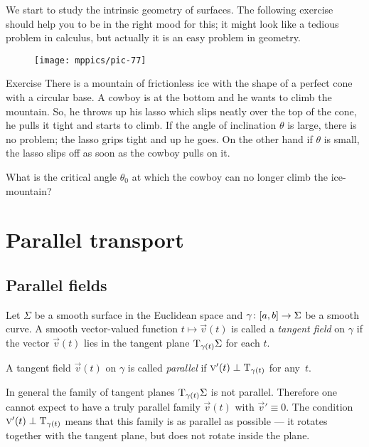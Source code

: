 We start to study the intrinsic geometry of surfaces.
The following exercise should help you to be in the right mood for this;
it might look like a tedious problem in calculus, but actually it is an easy problem in geometry.

\begin{wrapfigure}{r}{33 mm}
\vskip-0mm
\centering
\texttt{[image: mppics/pic-77]}
\vskip-0mm
\end{wrapfigure}

\begin{thm}{Exercise}\label{ex:lasso}
There is a mountain of frictionless ice with the shape of a perfect cone with a circular base.
A cowboy is at the bottom and he wants to climb the mountain.
So, he throws up his lasso which slips neatly over the top of the cone, he pulls it tight and starts to climb.
If the angle of inclination $\theta$ is large, there is no problem; the lasso grips tight and up he goes.
On the other hand if $\theta$ is small, the lasso slips off as soon as the cowboy pulls on it.

What is the critical angle $\theta_0$ at which the cowboy can no longer climb the ice-mountain?
\end{thm}

\chapter{Parallel transport}

\section*{Parallel fields}

Let $\Sigma$ be a smooth surface in the Euclidean space and $\gamma\:[a,b]\z\to \Sigma$ be a smooth curve.
A smooth vector-valued function $t\mapsto {\vec v}(t)$ is called a \emph{tangent field} on $\gamma$ if
the vector ${\vec v}(t)$ lies in the tangent plane $\mathrm{T}_{\gamma(t)}\Sigma$ for each $t$.

A tangent field ${\vec v}(t)$ on $\gamma$ is called \emph{parallel} if ${\textsc v}'(t)\perp\mathrm{T}_{\gamma(t)}$ for any~$t$.

In general the family of tangent planes $\mathrm{T}_{\gamma(t)}\Sigma$ is not parallel.
Therefore one cannot expect to have a truly parallel family ${\vec v}(t)$ with ${\vec v}'\equiv 0$.
The condition ${\textsc v}'(t)\perp\mathrm{T}_{\gamma(t)}$ means that this family is as parallel as possible --- it rotates together with the tangent plane, but does not rotate inside the plane.

